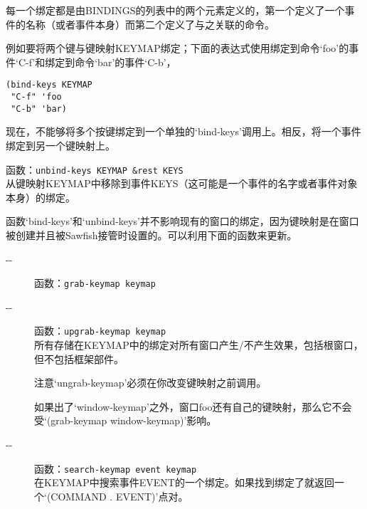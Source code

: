 \documentclass{book}
\begin{document}
\begin{CJK*}{UTF8}{gbsn}
\begin{description}
每一个绑定都是由BINDINGS的列表中的两个元素定义的，第一个定义了一个事件的名称（或者事件本身）而第二个定义了与之关联的命令。

例如要将两个键与键映射KEYMAP绑定；下面的表达式使用绑定到命令`foo'的事件`C-f'和绑定到命令`bar'的事件`C-b'，
\begin{verbatim}
(bind-keys KEYMAP
 "C-f" 'foo
 "C-b" 'bar)
\end{verbatim}
现在，不能够将多个按键绑定到一个单独的`bind-keys'调用上。相反，将一个事件绑定到另一个键映射上。
\item[-{}-] 函数：\verb|unbind-keys KEYMAP &rest KEYS|\\
从键映射KEYMAP中移除到事件KEYS（这可能是一个事件的名字或者事件对象本身）的绑定。
\end{description}

函数`bind-keys'和`unbind-keys'并不影响现有的窗口的绑定，因为键映射是在窗口被创建并且被Sawfish接管时设置的。可以利用下面的函数来更新。
\begin{description}
\item[-{}-] 函数：\verb|grab-keymap keymap|
\item[-{}-] 函数：\verb|upgrab-keymap keymap|\\
所有存储在KEYMAP中的绑定对所有窗口产生/不产生效果，包括根窗口，但不包括框架部件。

注意`ungrab-keymap'必须在你改变键映射之前调用。

如果出了`window-keymap'之外，窗口foo还有自己的键映射，那么它不会受`(grab-keymap window-keymap)'影响。
\item[-{}-] 函数：\verb|search-keymap event keymap|\\
在KEYMAP中搜索事件EVENT的一个绑定。如果找到绑定了就返回一个`(COMMAND . EVENT)'点对。
\end{description}


\end{CJK*}
\end{document}
